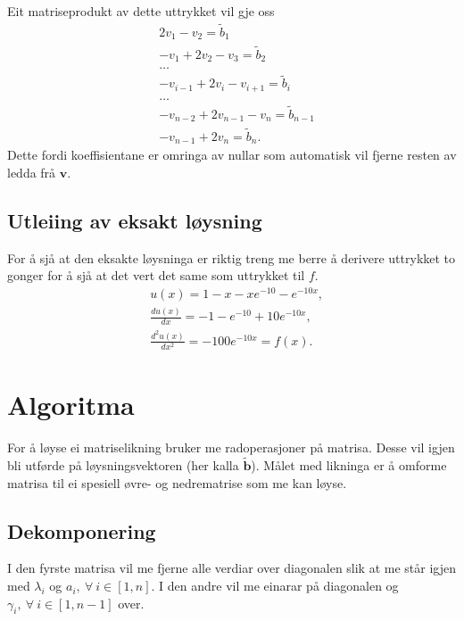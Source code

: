 \documentclass[11pt, a4paper]{article}
\begin{document}
  Eit matriseprodukt av dette uttrykket vil gje oss
  \begin{align*}
    &2v_1 - v_2 = \tilde{b}_1 \\
    &-v_1 + 2v_2 - v_3 = \tilde{b}_2 \\
    &\dots \\
    &-v_{i-1} + 2v_i - v_{i+1} = \tilde{b}_i \\
    &\dots \\
    &-v_{n-2} + 2v_{n-1} -v_{n} = \tilde{b}_{n-1} \\
    &-v_{n-1} + 2v_{n} = \tilde{b}_n.
  \end{align*}
  Dette fordi koeffisientane er omringa av nullar som automatisk vil fjerne resten av ledda frå 
  $\mathbf{v}$.

  \subsection{Utleiing av eksakt løysning}
    For å sjå at den eksakte løysninga er riktig treng me berre å derivere uttrykket to gonger for å
    sjå at det vert det same som uttrykket til $f$.
    \begin{align*}
      &u(x) = 1 - x - xe^{-10} - e^{-10x}, \\
      &\frac{du(x)}{dx} = -1 -e^{-10} + 10e^{-10x}, \\
      &\frac{d^2u(x)}{dx^2} = -100e^{-10x} = f(x).
    \end{align*}

\section{Algoritma}
  For å løyse ei matriselikning bruker me radoperasjoner på matrisa. Desse vil igjen bli utførde på
  løysningsvektoren (her kalla $\mathbf{\tilde{b}}$). Målet med likninga er å omforme matrisa til ei 
  spesiell øvre-  og nedrematrise som me kan løyse. 
  
  \subsection{Dekomponering}
    I den fyrste matrisa vil me fjerne alle verdiar over diagonalen slik at me står igjen med $\lambda_i$ og $a_i, \ \forall \ i \in [1, n]$. I den andre vil me einarar på diagonalen og $\gamma_i, \ \forall \ i \in [1, n - 1]$ over.
\end{document}
